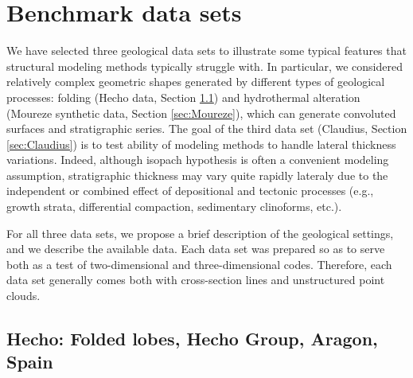 \documentclass[final]{ring20}
\begin{document}
\section{Benchmark data sets}\label{sec:data}

We have selected three geological data sets to illustrate some typical features that structural modeling methods typically struggle with. In particular, we considered relatively complex geometric shapes generated by different types of geological processes: folding (Hecho data, Section \ref{sec:Hecho}) and hydrothermal alteration (Moureze synthetic data, Section \ref{sec:Moureze}), which can generate convoluted surfaces and stratigraphic series. The goal of the third data set (Claudius, Section \ref{sec:Claudius}) is to test ability of modeling methods to handle lateral thickness variations. Indeed, although isopach hypothesis is often a convenient modeling assumption, stratigraphic thickness may vary quite rapidly lateraly due to the independent or combined effect of depositional and tectonic processes (e.g., growth strata, differential compaction, sedimentary clinoforms, etc.). 

For all three data sets, we propose a brief description of the geological settings, and we describe the available data. Each data set was prepared so as to serve both as a test of two-dimensional and three-dimensional codes. Therefore, each data set generally comes both with cross-section lines and unstructured point clouds.


\subsection{Hecho: Folded lobes, Hecho Group, Aragon, Spain}
\label{sec:Hecho}
\end{document}
